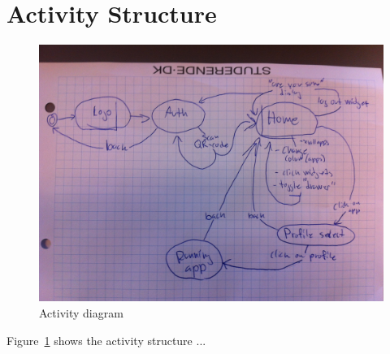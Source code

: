\section{Activity Structure}

\begin{figure}[h!]
	\centering
	\includegraphics[width=1\textwidth]{gfx/activity-diagram.jpg}
	\caption{Activity diagram}
	\label{fig:activity_diagram}
\end{figure}

Figure~\ref{fig:activity_diagram} shows the activity structure ... 